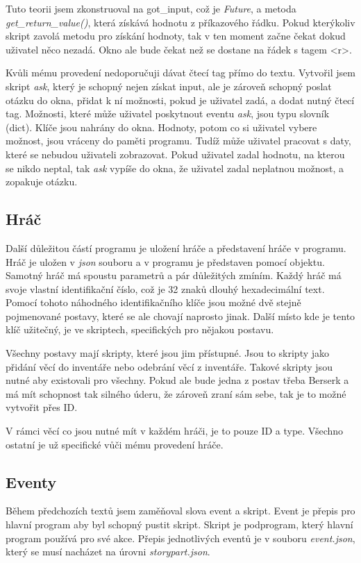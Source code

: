 \documentclass[12pt,a4paper]{article}
\begin{document}
Tuto teorii jsem zkonstruoval na got\_input, což je \textit{Future}, a metoda \textit{get\_return\_value()}, která získává hodnotu z příkazového řádku. Pokud kterýkoliv skript zavolá metodu pro získání hodnoty, tak v ten moment začne čekat dokud uživatel něco nezadá. Okno ale bude čekat než se dostane na řádek s tagem <r>.

Kvůli mému provedení nedoporučuji dávat čtecí tag přímo do textu. Vytvořil jsem skript \textit{ask}, který je schopný nejen získat input, ale je zároveň schopný poslat otázku do okna, přidat k ní možnosti, pokud je uživatel zadá, a dodat nutný čtecí tag. Možnosti, které může uživatel poskytnout eventu \textit{ask}, jsou typu slovník (dict). Klíče jsou nahrány do okna. Hodnoty, potom co si uživatel vybere možnost, jsou vráceny do paměti programu. Tudíž může uživatel pracovat s daty, které se nebudou uživateli zobrazovat. Pokud uživatel zadal hodnotu, na kterou se nikdo neptal, tak \textit{ask} vypíše do okna, že uživatel zadal neplatnou možnost, a zopakuje otázku.
\subsection{Hráč}
Další důležitou částí programu je uložení hráče a představení hráče v programu. Hráč je uložen v \textit{json} souboru a v programu je představen pomocí objektu. Samotný hráč má spoustu parametrů a pár důležitých zmíním. Každý hráč má svoje vlastní identifikační číslo, což je 32 znaků dlouhý hexadecimální text. Pomocí tohoto náhodného identifikačního klíče jsou možné dvě stejně pojmenované postavy, které se ale chovají naprosto jinak. Další místo kde je tento klíč užitečný, je ve skriptech, specifických pro nějakou postavu.

Všechny postavy mají skripty, které jsou jim přístupné. Jsou to skripty jako přidání věcí do inventáře nebo odebrání věcí z inventáře. Takové skripty jsou nutné aby existovali pro všechny. Pokud ale bude jedna z postav třeba Berserk a má mít schopnost tak silného úderu, že zároveň zraní sám sebe, tak je to možné vytvořit přes ID. 

V rámci věcí co jsou nutné mít v každém hráči, je to pouze ID a type. Všechno ostatní je už specifické vůči mému provedení hráče.

\subsection{Eventy}
Během předchozích textů jsem zaměňoval slova event a skript. Event je přepis pro hlavní program aby byl schopný pustit skript. Skript je podprogram, který hlavní program používá pro své akce. Přepis jednotlivých eventů je v souboru \textit{event.json}, který se musí nacházet na úrovni \textit{storypart.json}.
\end{document}
